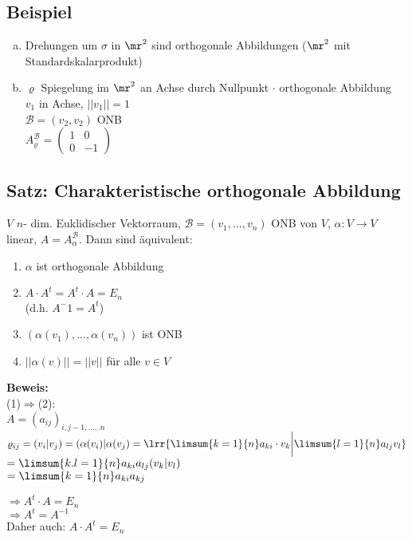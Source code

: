 \subsection{Beispiel}
	\begin{enumerate}[a)]
		\item  Drehungen um $ \sigma $ in $ \mr^2 $ sind orthogonale Abbildungen ($ \mr^2 $ mit Standardskalarprodukt)
		\item  $ \varrho $ Spiegelung im $ \mr^2 $ an Achse durch Nullpunkt $ \cdot $ orthogonale Abbildung\\
		$ v_1 $ in Achse, $||v_1||=1$\\
		$ \mathcal{B}=(v_2,v_2) $ ONB\\
		$ A_\varrho^{\mathcal{B}}=\begin{pmatrix}
		1&0\\
		0&-1
		\end{pmatrix}$
	\end{enumerate}
	
\subsection{Satz: Charakteristische orthogonale Abbildung}
	$ V $ $ n $- dim. Euklidischer Vektorraum, $ \mathcal{B}=(v_1,...,v_n) $ ONB von $ V $, $ \alpha: V\rightarrow V $ linear, $ A=A_\alpha^{\mathcal{B}} $. Dann sind äquivalent:
	\begin{enumerate}[(1)]
		\item $ \alpha $ ist orthogonale Abbildung
		\item  $ A\cdot A^t=A^t\cdot A=E_n $\\
		(d.h. $ A^-1=A^t $)
		\item  $ (\alpha(v_1),...,\alpha(v_n)) $ ist ONB
		\item $ ||\alpha(v)||=||v|| $ für alle $ v\in V $
	\end{enumerate}
	
	\textbf{Beweis:}\\
	(1)$ \Rightarrow $(2):\\
	$ A=(a_{ij})_{i,j-1,...,.n} $\\
	$ \varrho_{ij}=(v_i|v_j)=(\alpha(v_i)|\alpha(v_j)=\lrr{\limsum{k=1}{n}a_{ki}\cdot v_k\bigg|\limsum{l=1}{n}a_{lj}v_l} $\\
	$ =\limsum{k.l=1}{n}a_{ki}a_{lj}(v_k|v_l) $\\
	$ =\limsum{k=1}{n}a_{ki}a_{kj} $
	
	$ \Rightarrow A^t\cdot A=E_n $\\
	$ \Rightarrow A^t=A^{-1} $\\
	Daher auch: $ A\cdot A^t=E_n $
	
